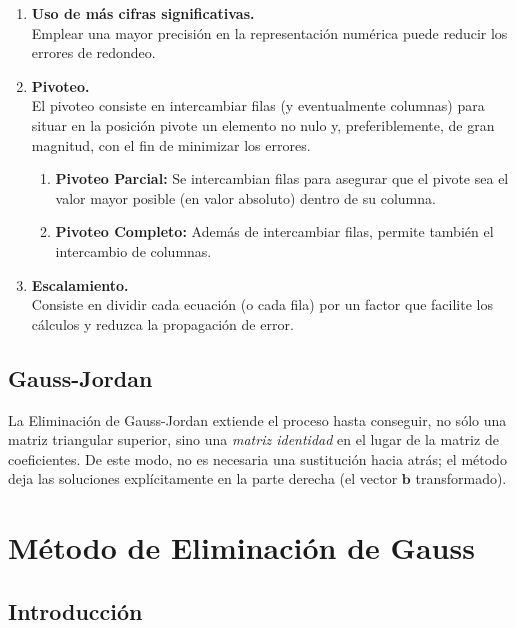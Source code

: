 \documentclass[12pt,letterpaper]{article}
\theoremstyle{definition}
\theoremstyle{plain}
\theoremstyle{remark}
\begin{document}
\begin{enumerate}
    \item \textbf{Uso de más cifras significativas.}\\
    Emplear una mayor precisión en la representación numérica puede reducir los errores de redondeo.

    \item \textbf{Pivoteo.}\\
    El pivoteo consiste en intercambiar filas (y eventualmente columnas) para situar en la posición pivote un elemento no nulo y, preferiblemente, de gran magnitud, con el fin de minimizar los errores.
    \begin{enumerate}
        \item \textbf{Pivoteo Parcial:} Se intercambian filas para asegurar que el pivote sea el valor mayor posible (en valor absoluto) dentro de su columna. 
        \item \textbf{Pivoteo Completo:} Además de intercambiar filas, permite también el intercambio de columnas.
    \end{enumerate}

    \item \textbf{Escalamiento.}\\
    Consiste en dividir cada ecuación (o cada fila) por un factor que facilite los cálculos y reduzca la propagación de error.

\end{enumerate}

\subsection{Gauss-Jordan}

La Eliminación de Gauss-Jordan extiende el proceso hasta conseguir, no sólo una matriz triangular superior, sino una \textit{matriz identidad} en el lugar de la matriz de coeficientes. De este modo, no es necesaria una sustitución hacia atrás; el método deja las soluciones explícitamente en la parte derecha (el vector \(\mathbf{b}\) transformado).

\section{Método de Eliminación de Gauss}

\subsection*{Introducción}
\end{document}
